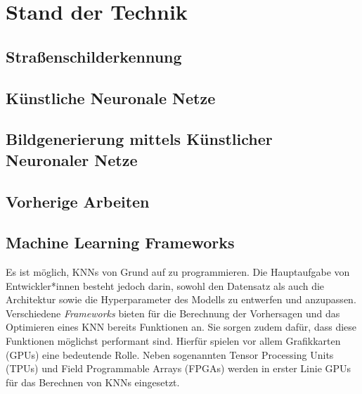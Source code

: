\chapter{Stand der Technik}
\section{Straßenschilderkennung}


\section{Künstliche Neuronale Netze}


\section{Bildgenerierung mittels Künstlicher Neuronaler Netze}


%

\section{Vorherige Arbeiten}


\section{Machine Learning Frameworks}


Es ist möglich, \acp{KNN} von Grund auf zu programmieren. Die Hauptaufgabe von Entwickler*innen besteht jedoch darin, sowohl den Datensatz als auch die Architektur sowie die Hyperparameter des Modells zu entwerfen und anzupassen. Verschiedene \emph{Frameworks} bieten für die Berechnung der Vorhersagen und das Optimieren eines \ac{KNN} bereits Funktionen an. Sie sorgen zudem dafür, dass diese Funktionen möglichst performant sind. Hierfür spielen vor allem Grafikkarten (\acp{GPU}) eine bedeutende Rolle. Neben sogenannten Tensor Processing Units (TPUs) und Field Programmable Arrays (FPGAs) werden in erster Linie \acp{GPU} für das Berechnen von \acp{KNN} eingesetzt. \cite{frameworks}

